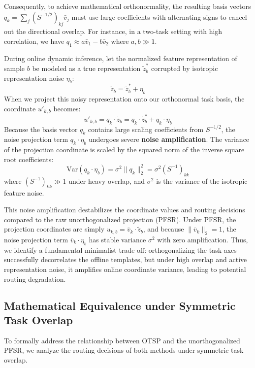 Consequently, to achieve mathematical orthonormality, the resulting basis vectors $q_k = \sum_j (S^{-1/2})_{kj} \bar{v}_j$ must use large coefficients with alternating signs to cancel out the directional overlap. For instance, in a two-task setting with high correlation, we have $q_1 \approx a \bar{v}_1 - b \bar{v}_2$ where $a, b \gg 1$. 

During online dynamic inference, let the normalized feature representation of sample $b$ be modeled as a true representation $\tilde{z}_b^*$ corrupted by isotropic representation noise $\eta_b$:
\begin{equation}
\tilde{z}_b = \tilde{z}_b^* + \eta_b
\end{equation}
When we project this noisy representation onto our orthonormal task basis, the coordinate $u'_{k,b}$ becomes:
\begin{equation}
u'_{k,b} = q_k \cdot \tilde{z}_b = q_k \cdot \tilde{z}_b^* + q_k \cdot \eta_b
\end{equation}
Because the basis vector $q_k$ contains large scaling coefficients from $S^{-1/2}$, the noise projection term $q_k \cdot \eta_b$ undergoes severe \textbf{noise amplification}. The variance of the projection coordinate is scaled by the squared norm of the inverse square root coefficients:
\begin{equation}
\text{Var}(q_k \cdot \eta_b) = \sigma^2 \|q_k\|_2^2 = \sigma^2 (S^{-1})_{kk}
\end{equation}
where $(S^{-1})_{kk} \gg 1$ under heavy overlap, and $\sigma^2$ is the variance of the isotropic feature noise.

This noise amplification destabilizes the coordinate values and routing decisions compared to the raw unorthogonalized projection (PFSR). Under PFSR, the projection coordinates are simply $u_{k,b} = \bar{v}_k \cdot \tilde{z}_b$, and because $\|\bar{v}_k\|_2 = 1$, the noise projection term $\bar{v}_k \cdot \eta_b$ has stable variance $\sigma^2$ with zero amplification. Thus, we identify a fundamental minimalist trade-off: orthogonalizing the task axes successfully decorrelates the offline templates, but under high overlap and active representation noise, it amplifies online coordinate variance, leading to potential routing degradation.

\subsection{Mathematical Equivalence under Symmetric Task Overlap}
\label{sec:symmetric_equivalence}
To formally address the relationship between OTSP and the unorthogonalized PFSR, we analyze the routing decisions of both methods under symmetric task overlap. 

